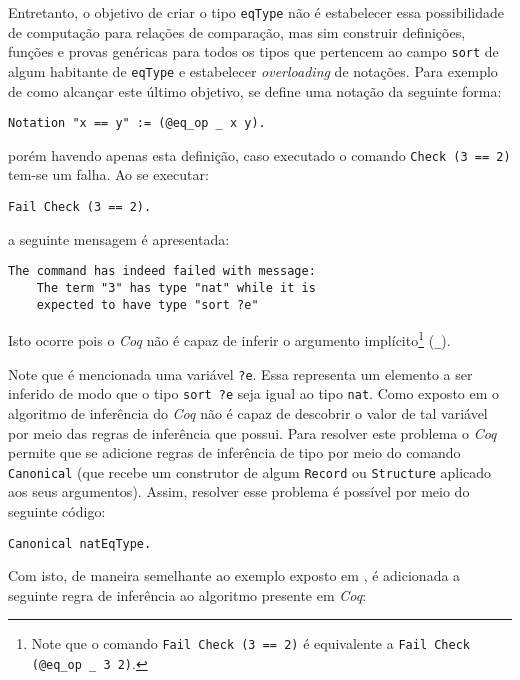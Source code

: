 Entretanto, o objetivo de criar o tipo \lstinline[language = coq]$eqType$ não é estabelecer essa possibilidade de computação para relações de comparação, mas sim construir definições, funções e provas genéricas para todos os tipos que pertencem ao campo \lstinline[language = coq]$sort$ de algum habitante de \lstinline[language = coq]$eqType$ e estabelecer \textit{overloading} de notações. Para exemplo de como alcançar este último objetivo, se define uma notação da seguinte forma:

\begin{lstlisting}[language = coq]
        Notation "x == y" := (@eq_op _ x y).
\end{lstlisting}
porém havendo apenas esta definição, caso executado o comando \lstinline[language = coq]$Check (3 == 2)$ tem-se um falha. Ao se executar:
\begin{lstlisting}[language = coq]
    Fail Check (3 == 2).
\end{lstlisting}
a seguinte mensagem é apresentada:
\begin{lstlisting}[language = coq-error]
    The command has indeed failed with message:
    The term "3" has type "nat" while it is 
    expected to have type "sort ?e"
\end{lstlisting}
Isto ocorre pois o \textit{Coq} não é capaz de inferir o argumento implícito\footnote{Note que o comando \lstinline[language = coq]$Fail Check (3 == 2)$ é equivalente a \lstinline[language = coq]$Fail Check (@eq_op _ 3 2)$.}  (\lstinline[language = coq]$_$).

Note que é mencionada uma variável \lstinline[language = coq]$?e$. Essa representa um elemento a ser inferido de modo que o tipo \lstinline[language = coq]$sort ?e$ seja igual ao tipo \lstinline[language = coq]$nat$. Como exposto em \cite{10.1007/978-3-642-39634-2_5} o algoritmo de inferência do \textit{Coq} não é capaz de descobrir o valor de tal variável por meio das regras de inferência que possui. Para resolver este problema 
o \textit{Coq} permite que se adicione regras de inferência de tipo por meio do comando \lstinline[language = coq]$Canonical$ (que recebe um construtor de algum \lstinline[language = coq]$Record$ ou \lstinline[language = coq]$Structure$ aplicado aos seus argumentos). Assim, resolver esse problema é possível por meio do seguinte código:
\begin{lstlisting}[language = coq]
    Canonical natEqType.
\end{lstlisting}
Com isto, de maneira semelhante ao exemplo exposto em \cite{10.1007/978-3-642-39634-2_5}, é adicionada a seguinte regra de inferência ao algoritmo presente em \textit{Coq}:

